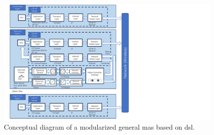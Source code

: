 \begin{figure}[htb]
    \centering
    \includegraphics[width=\textwidth]{figures/DSLConceptual.pdf}
    \caption{Conceptual diagram of a modularized general \gls{mas} based on \gls{dsl}. \label{fig: DSLConceptual}}
\end{figure}
        